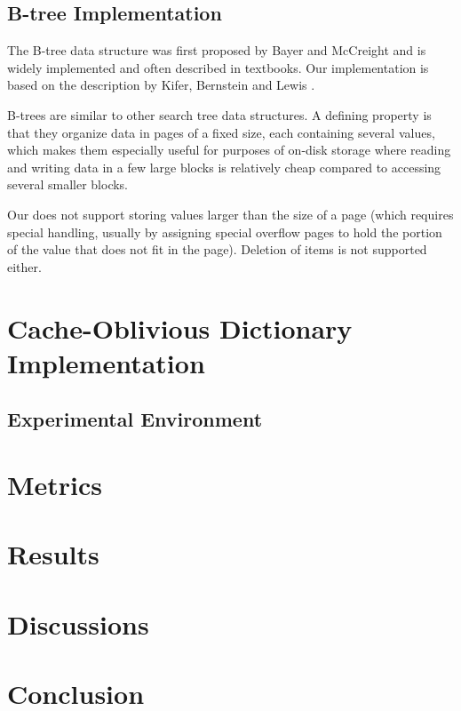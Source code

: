 \documentclass{acm_proc_article-sp}
\begin{document}
\subsection{B-tree Implementation}
The B-tree data structure was first proposed by Bayer and McCreight
\cite{bayer1970oam} and is widely implemented and often described in
textbooks. Our implementation is based on the description by Kifer, Bernstein
and Lewis \cite{kifer2006dsa}.

B-trees are similar to other search tree data structures. A defining property
is that they organize data in pages of a fixed size, each containing several
values, which makes them especially useful for purposes of on-disk storage
where reading and writing data in a few large blocks is relatively cheap
compared to accessing several smaller blocks.


Our does not support storing values larger than the size of a page (which
requires special handling, usually by assigning special overflow pages to hold
the portion of the value that does not fit in the page). Deletion of items is
not supported either.

\section{Cache-Oblivious Dictionary Implementation}


\subsection{Experimental Environment}

\section{Metrics}

\section{Results}
%
%   

\section{Discussions}

\section{Conclusion}



\end{document}
